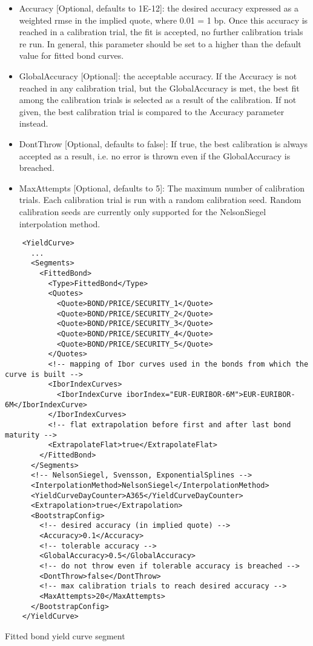 \begin{itemize}
\item Accuracy [Optional, defaults to 1E-12]: the desired accuracy expressed as a weighted rmse in the implied quote,
  where 0.01 = 1 bp. Once this accuracy is reached in a calibration trial, the fit is accepted, no further calibration
  trials re run. In general, this parameter should be set to a higher than the default value for fitted bond curves.
\item GlobalAccuracy [Optional]: the acceptable accuracy. If the Accuracy is not reached in any calibration trial, but
  the GlobalAccuracy is met, the best fit among the calibration trials is selected as a result of the calibration. If
  not given, the best calibration trial is compared to the Accuracy parameter instead.
\item DontThrow [Optional, defaults to false]: If true, the best calibration is always accepted as a result, i.e. no
  error is thrown even if the GlobalAccuracy is breached.
\item MaxAttempts [Optional, defaults to 5]: The maximum number of calibration trials. Each calibration trial is run with a random calibration
  seed. Random calibration seeds are currently only supported for the NelsonSiegel interpolation method.
\end{itemize}

\begin{listing}[H]
\begin{verbatim}
    <YieldCurve>
      ...
      <Segments>
        <FittedBond>
          <Type>FittedBond</Type>
          <Quotes>
            <Quote>BOND/PRICE/SECURITY_1</Quote>
            <Quote>BOND/PRICE/SECURITY_2</Quote>
            <Quote>BOND/PRICE/SECURITY_3</Quote>
            <Quote>BOND/PRICE/SECURITY_4</Quote>
            <Quote>BOND/PRICE/SECURITY_5</Quote>
          </Quotes>
          <!-- mapping of Ibor curves used in the bonds from which the curve is built -->
          <IborIndexCurves>
            <IborIndexCurve iborIndex="EUR-EURIBOR-6M">EUR-EURIBOR-6M</IborIndexCurve>
          </IborIndexCurves>
          <!-- flat extrapolation before first and after last bond maturity -->
          <ExtrapolateFlat>true</ExtrapolateFlat>
        </FittedBond>
      </Segments>
      <!-- NelsonSiegel, Svensson, ExponentialSplines -->
      <InterpolationMethod>NelsonSiegel</InterpolationMethod>
      <YieldCurveDayCounter>A365</YieldCurveDayCounter>
      <Extrapolation>true</Extrapolation>
      <BootstrapConfig>
        <!-- desired accuracy (in implied quote) -->
        <Accuracy>0.1</Accuracy>
        <!-- tolerable accuracy -->
        <GlobalAccuracy>0.5</GlobalAccuracy>
        <!-- do not throw even if tolerable accuracy is breached -->
        <DontThrow>false</DontThrow>
        <!-- max calibration trials to reach desired accuracy -->
        <MaxAttempts>20</MaxAttempts>
      </BootstrapConfig>
    </YieldCurve>
\end{verbatim}
\caption{Fitted bond yield curve segment}
\label{lst:fitted_bond_segment}
\end{listing}

